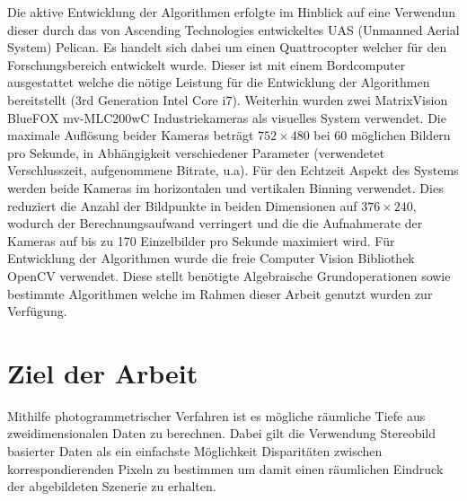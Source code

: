 Die aktive Entwicklung der Algorithmen erfolgte im Hinblick auf eine Verwendun dieser durch das von Ascending Technologies \cite{asctec} entwickeltes UAS (Unmanned Aerial System) Pelican. %
Es handelt sich dabei um einen Quattrocopter welcher für den Forschungsbereich entwickelt wurde. Dieser ist mit einem Bordcomputer ausgestattet welche die nötige Leistung für die Entwicklung der Algorithmen bereitstellt (3rd Generation Intel Core i7). Weiterhin wurden zwei MatrixVision BlueFOX mv-MLC200wC Industriekameras als visuelles System verwendet. Die maximale Auflösung beider Kameras beträgt $752\times480$ bei 60 möglichen Bildern pro Sekunde, in Abhängigkeit verschiedener Parameter (verwendetet Verschlusszeit, aufgenommene Bitrate, u.a). Für den Echtzeit Aspekt des Systems werden beide Kameras im horizontalen und vertikalen Binning verwendet. Dies reduziert die Anzahl der Bildpunkte in beiden Dimensionen auf $376\times240$, wodurch der Berechnungsaufwand verringert und die die Aufnahmerate der Kameras auf bis zu 170 Einzelbilder pro Sekunde maximiert wird.
	\noindent
Für Entwicklung der Algorithmen wurde die freie Computer Vision Bibliothek OpenCV \cite{opencv} verwendet. Diese stellt benötigte Algebraische Grundoperationen sowie bestimmte Algorithmen welche im Rahmen dieser Arbeit genutzt wurden zur Verfügung.


\section{Ziel der Arbeit}
\label{sec:ziel_der_arbeit}
Mithilfe photogrammetrischer Verfahren ist es mögliche räumliche Tiefe aus zweidimensionalen Daten zu berechnen. Dabei gilt die Verwendung Stereobild basierter Daten als ein einfachste Möglichkeit Disparitäten zwischen korrespondierenden Pixeln zu bestimmen um damit einen räumlichen Eindruck der abgebildeten Szenerie zu erhalten. \\

